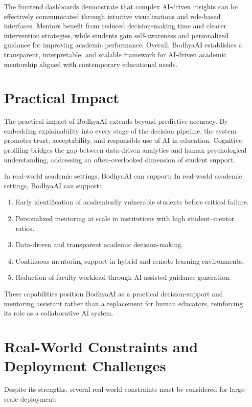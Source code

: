 \documentclass[12pt,a4paper]{report}
\begin{document}
The frontend dashboards demonstrate that complex AI-driven insights can be effectively
communicated through intuitive visualizations and role-based interfaces. Mentors benefit
from reduced decision-making time and clearer intervention strategies, while students gain
self-awareness and personalized guidance for improving academic performance. Overall,
BodhyaAI establishes a transparent, interpretable, and scalable framework for AI-driven
academic mentorship aligned with contemporary educational needs.

\section{Practical Impact}

The practical impact of BodhyaAI extends beyond predictive accuracy. By embedding
explainability into every stage of the decision pipeline, the system promotes trust,
acceptability, and responsible use of AI in education. Cognitive profiling bridges the gap
between data-driven analytics and human psychological understanding, addressing an
often-overlooked dimension of student support.

In real-world academic settings, BodhyaAI can support:
In real-world academic settings, BodhyaAI can support:
\begin{enumerate}
    \item Early identification of academically vulnerable students before critical failure.
    \item Personalized mentoring at scale in institutions with high student–mentor ratios.
    \item Data-driven and transparent academic decision-making.
    \item Continuous mentoring support in hybrid and remote learning environments.
    \item Reduction of faculty workload through AI-assisted guidance generation.
\end{enumerate}

These capabilities position BodhyaAI as a practical decision-support and mentoring
assistant rather than a replacement for human educators, reinforcing its role as a
collaborative AI system.

\section{Real-World Constraints and Deployment Challenges}

Despite its strengths, several real-world constraints must be considered for large-scale
deployment:
\end{document}
